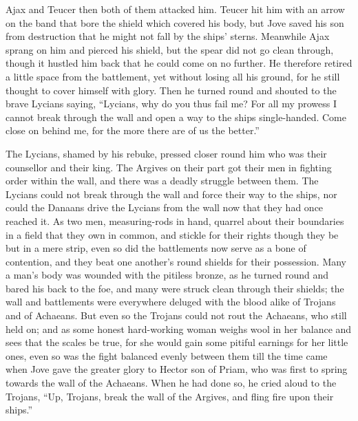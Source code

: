 Ajax and Teucer then both of them attacked him. Teucer hit him with an
arrow on the band that bore the shield which covered his body, but Jove
saved his son from destruction that he might not fall by the ships’
sterns. Meanwhile Ajax sprang on him and pierced his shield, but the spear
did not go clean through, though it hustled him back that he could come on
no further. He therefore retired a little space from the battlement, yet
without losing all his ground, for he still thought to cover himself with
glory. Then he turned round and shouted to the brave Lycians saying,
“Lycians, why do you thus fail me? For all my prowess I cannot break
through the wall and open a way to the ships single-handed. Come close on
behind me, for the more there are of us the better.”

The Lycians, shamed by his rebuke, pressed closer round him who was their
counsellor and their king. The Argives on their part got their men in
fighting order within the wall, and there was a deadly struggle between
them. The Lycians could not break through the wall and force their way to
the ships, nor could the Danaans drive the Lycians from the wall now that
they had once reached it. As two men, measuring-rods in hand, quarrel
about their boundaries in a field that they own in common, and stickle for
their rights though they be but in a mere strip, even so did the
battlements now serve as a bone of contention, and they beat one another’s
round shields for their possession. Many a man’s body was wounded with the
pitiless bronze, as he turned round and bared his back to the foe, and
many were struck clean through their shields; the wall and battlements
were everywhere deluged with the blood alike of Trojans and of Achaeans.
But even so the Trojans could not rout the Achaeans, who still held on;
and as some honest hard-working woman weighs wool in her balance and sees
that the scales be true, for she would gain some pitiful earnings for her
little ones, even so was the fight balanced evenly between them till the
time came when Jove gave the greater glory to Hector son of Priam, who was
first to spring towards the wall of the Achaeans. When he had done so, he
cried aloud to the Trojans, “Up, Trojans, break the wall of the Argives,
and fling fire upon their ships.”

